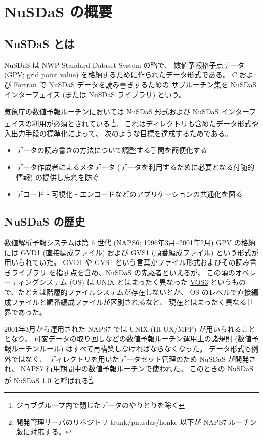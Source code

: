 \section{NuSDaS の概要}\label{機能}

\subsection{NuSDaS とは}

NuSDaS は NWP Standard Dataset System の略で、
数値予報格子点データ (GPV; grid point value)
を格納するために作られたデータ形式である。
C および Fortran で NuSDaS データを読み書きするための
サブルーチン集を NuSDaS インターフェイス (または NuSDaS ライブラリ) という。

気象庁の数値予報ルーチンにおいては
NuSDaS 形式および NuSDaS インターフェイスの利用が必須とされている%
\footnote{ジョブグループ内で閉じたデータのやりとりを除く}。
これはディレクトリも含めたデータ形式や入出力手段の標準化によって、
次のような目標を達成するためである。
\begin{itemize}
\item データの読み書きの方法について調整する手間を簡便化する
\item データ作成者によるメタデータ
	(データを利用するために必要となる付随的情報)
	の提供し忘れを防ぐ
\item デコード・可視化・エンコードなどのアプリケーションの共通化を図る
\end{itemize}

\subsection{NuSDaS の歴史}

数値解析予報システムは第 6 世代 (NAPS6; 1996年3月--2001年2月)
GPV の格納には GVD1 (直接編成ファイル) および
GVS1 (順番編成ファイル) という形式が用いられていた。
GVD1 や GVS1 という言葉がファイル形式およびその読み書きライブラリ
を指す点を含め、NuSDaS の先駆者といえるが、
この頃のオペレーティングシステム (OS) は UNIX とはまったく異なった
\href{http://www.google.com/search?q=VOS3}{VOS3}
というもので、たとえば階層的ファイルシステムが存在しないとか、
OS のレベルで直接編成ファイルと順番編成ファイルが区別されるなど、
現在とはまったく異なる世界であった。

2001年3月から運用された NAPS7 では UNIX (HI-UX/MPP) が用いられることとなり、
可変データの取り回しなどの数値予報ルーチン運用上の諸規則
(数値予報ルーチンルール) はすべて再構築しなければならなくなった。
データ形式も例外ではなく、
ディレクトリを用いたデータセット管理のため NuSDaS が開発され、
NAPS7 行用期間中の数値予報ルーチンで使われた。
このときの NuSDaS が NuSDaS 1.0 と呼ばれる\footnote{
	開発管理サーバのリポジトリ trunk/pnusdas/honke 以下が
	NAPS7 ルーチン版に対応する。
}。

